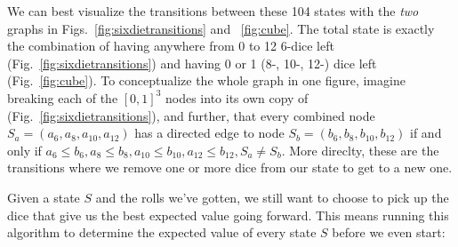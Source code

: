 \documentclass[11pt, oneside]{article} 	%
\begin{document}
We can best visualize the transitions between these 104 states with the \emph{two} graphs in Figs.~\ref{fig:sixdietransitions} and ~\ref{fig:cube}. The total state is exactly the combination of having anywhere from 0 to 12 6-dice left (Fig.~\ref{fig:sixdietransitions}) and having 0 or 1 (8-, 10-, 12-) dice left (Fig.~\ref{fig:cube}). To conceptualize the whole graph in one figure, imagine breaking each of the $[0,1]^3$ nodes into its own copy of (Fig.~\ref{fig:sixdietransitions}), and further, that every combined node $S_a = (a_6, a_8, a_{10}, a_{12})$ has a directed edge to node $S_b = (b_6, b_8, b_{10}, b_{12})$ if and only if $a_6 \leq b_6, a_8 \leq b_8, a_{10} \leq b_{10}, a_{12} \leq b_{12}, S_a \neq S_b$. More direclty, these are the transitions where we remove one or more dice from our state to get to a new one.

Given a state $S$ and the rolls we've gotten, we still want to choose to pick up the dice that give us the best expected value going forward. This means running this algorithm to determine the expected value of every state $S$ before we even start:

\end{document}
